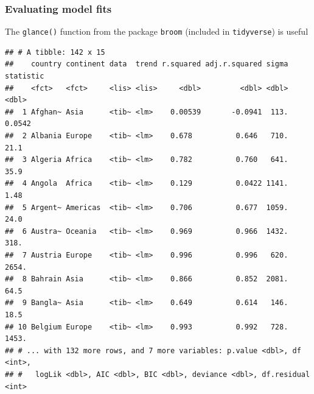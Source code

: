 \documentclass[12pt,]{article}
\newenvironment{Shaded}{\begin{snugshade}}{\end{snugshade}}
\newcommand{\KeywordTok}[1]{\textcolor[rgb]{0.13,0.29,0.53}{\textbf{#1}}}
\newcommand{\DataTypeTok}[1]{\textcolor[rgb]{0.13,0.29,0.53}{#1}}
\newcommand{\StringTok}[1]{\textcolor[rgb]{0.31,0.60,0.02}{#1}}
\newcommand{\OperatorTok}[1]{\textcolor[rgb]{0.81,0.36,0.00}{\textbf{#1}}}
\newcommand{\NormalTok}[1]{#1}
\begin{document}
\subsubsection{Evaluating model fits}\label{evaluating-model-fits}

The \texttt{glance()} function from the package \texttt{broom} (included
in \texttt{tidyverse}) is useful

\begin{Shaded}
\end{Shaded}

\begin{verbatim}
## # A tibble: 142 x 15
##    country continent data  trend r.squared adj.r.squared sigma statistic
##    <fct>   <fct>     <lis> <lis>     <dbl>         <dbl> <dbl>     <dbl>
##  1 Afghan~ Asia      <tib~ <lm>    0.00539       -0.0941  113.    0.0542
##  2 Albania Europe    <tib~ <lm>    0.678          0.646   710.   21.1   
##  3 Algeria Africa    <tib~ <lm>    0.782          0.760   641.   35.9   
##  4 Angola  Africa    <tib~ <lm>    0.129          0.0422 1141.    1.48  
##  5 Argent~ Americas  <tib~ <lm>    0.706          0.677  1059.   24.0   
##  6 Austra~ Oceania   <tib~ <lm>    0.969          0.966  1432.  318.    
##  7 Austria Europe    <tib~ <lm>    0.996          0.996   620. 2654.    
##  8 Bahrain Asia      <tib~ <lm>    0.866          0.852  2081.   64.5   
##  9 Bangla~ Asia      <tib~ <lm>    0.649          0.614   146.   18.5   
## 10 Belgium Europe    <tib~ <lm>    0.993          0.992   728. 1453.    
## # ... with 132 more rows, and 7 more variables: p.value <dbl>, df <int>,
## #   logLik <dbl>, AIC <dbl>, BIC <dbl>, deviance <dbl>, df.residual <int>
\end{verbatim}
\end{document}
